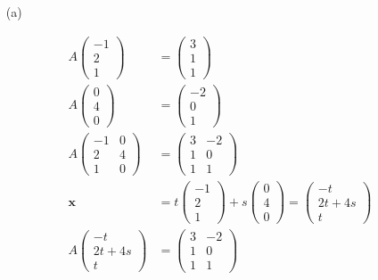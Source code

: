\documentclass{report}
\begin{document}
\sol

\begin{enumerate}
\item[(a)]


\begin{align*}
A \begin{pmatrix} -1 \\ 2 \\ 1 \end{pmatrix} &= \begin{pmatrix} 3 \\ 1 \\ 1 \end{pmatrix} \\
A \begin{pmatrix} 0 \\ 4 \\ 0 \end{pmatrix} &= \begin{pmatrix} -2 \\ 0 \\ 1 \end{pmatrix} \\
A \begin{pmatrix} -1 & 0 \\ 2 & 4 \\ 1 & 0 \end{pmatrix} &= \begin{pmatrix} 3 & -2 \\ 1 & 0 \\ 1 & 1 \end{pmatrix} \\
\mathbf{x} &= t \begin{pmatrix} -1 \\ 2 \\ 1 \end{pmatrix} + s \begin{pmatrix} 0 \\ 4 \\ 0 \end{pmatrix} = \begin{pmatrix} -t \\ 2t+4s \\ t \end{pmatrix} \\
A \begin{pmatrix} -t \\ 2t+4s \\ t \end{pmatrix} &= \begin{pmatrix} 3 & -2 \\ 1 & 0 \\ 1 & 1 \end{pmatrix} \\

\end{align*}
\end{enumerate}
\end{document}
